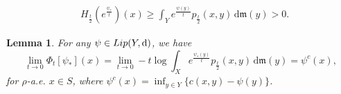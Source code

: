 \documentclass[10pt,a4paper]{amsart}
\newtheorem{lemma}{Lemma}
\newcommand{\Lip}{\mathop{\rm Lip}\nolimits}
\renewcommand{\d}{{\mathrm d}}
\newcommand{\mm}{\mathfrak m}
\begin{document}
		\begin{equation}\label{3.15}
			\begin{aligned}
				&H_\frac{t}{2}(e^\frac{\psi_*}{t})(x)
				\geq \int_{Y} e^{\frac{\psi(y)}{t}} p_\frac{t}{2}(x,y)\,\d\mm(y)>0.
			\end{aligned}
		\end{equation}

	\begin{lemma}\label{l0.20}
		For any $\psi\in \Lip(Y, \d)$,  we have 
		\begin{equation}\label{2.38}
			\lim_{t\rightarrow0}{\Phi}_t[\psi_{*}](x)=\lim_{t\rightarrow0}-t\log \int_X e^{\frac{\psi_*(y)}{t}} p_\frac{t}{2}(x,y)\,\d\mm(y)=\psi^c(x),
		\end{equation}
		for $\rho$-a.e. $x\in S$, where $\psi^c(x)=\inf_{y\in Y}\{c(x,y)-\psi(y)\}$.   
	\end{lemma}
\end{document}

